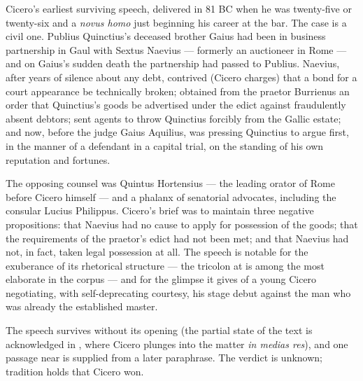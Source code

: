 
\noindent
Cicero's earliest surviving speech, delivered in 81 BC when he was twenty-five
or twenty-six and a \textit{novus homo} just beginning his career at the bar.
The case is a civil one. Publius Quinctius's deceased brother Gaius had been
in business partnership in Gaul with Sextus Naevius --- formerly an auctioneer
in Rome --- and on Gaius's sudden death the partnership had passed to
Publius. Naevius, after years of silence about any debt, contrived (Cicero
charges) that a bond for a court appearance be technically broken; obtained
from the praetor Burrienus an order that Quinctius's goods be advertised
under the edict against fraudulently absent debtors; sent agents to throw
Quinctius forcibly from the Gallic estate; and now, before the judge Gaius
Aquilius, was pressing Quinctius to argue first, in the manner of a defendant
in a capital trial, on the standing of his own reputation and fortunes.

The opposing counsel was Quintus Hortensius --- the leading orator of Rome
before Cicero himself --- and a phalanx of senatorial advocates, including
the consular Lucius Philippus. Cicero's brief was to maintain three negative
propositions: that Naevius had no cause to apply for possession of the
goods; that the requirements of the praetor's edict had not been met; and
that Naevius had not, in fact, taken legal possession at all. The speech is
notable for the exuberance of its rhetorical structure --- the tricolon at
 is among the most elaborate in the corpus --- and for the
glimpse it gives of a young Cicero negotiating, with self-deprecating
courtesy, his stage debut against the man who was already the established
master.

The speech survives without its opening (the partial state of the text
is acknowledged in , where Cicero plunges into the matter
\textit{in medias res}), and one passage near  is supplied
from a later paraphrase. The verdict is unknown; tradition holds that
Cicero won.
